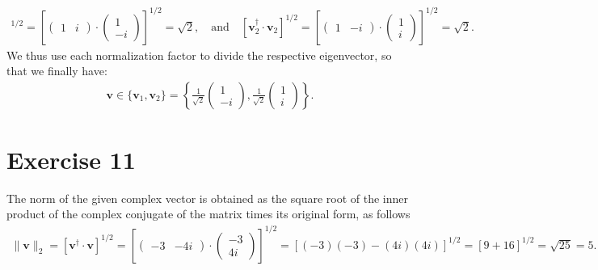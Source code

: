 \documentclass[letterpaper,11pt,twoside]{article}
\begin{document}
\begin{align*}
  [\bm{v}_1^\dagger\cdot\bm{v}_1]^{1/2}=\left[\begin{pmatrix}
    1&i
  \end{pmatrix}\cdot\begin{pmatrix}
    1\\-i
  \end{pmatrix}\right]^{1/2}=\sqrt{2},\quad\text{and}\quad
  [\bm{v}_2^\dagger\cdot\bm{v}_2]^{1/2}=\left[\begin{pmatrix}
    1&-i
  \end{pmatrix}\cdot\begin{pmatrix}
    1\\i
  \end{pmatrix}\right]^{1/2}=\sqrt{2}.
\end{align*}
We thus use each normalization factor to divide the respective eigenvector, so that we finally have:
\begin{align*}
  \bm{v}\in\{\bm{v}_1,\bm{v}_2\}=\left\{\frac{1}{\sqrt{2}}\begin{pmatrix}
  1\\-i\end{pmatrix},\frac{1}{\sqrt{2}}\begin{pmatrix}
  1\\i\end{pmatrix}\right\}.
\end{align*}
\section{Exercise 11} 
The norm of the given complex vector is obtained as the square root of the inner product of the complex conjugate of the matrix times its
original form, as follows
\begin{align*}
  \|\bm{v}\|_2=[\bm{v}^\dagger\cdot\bm{v}]^{1/2}=\left[
    \begin{pmatrix}
      -3&-4i
    \end{pmatrix}\cdot\begin{pmatrix}
      -3\\4i
    \end{pmatrix}
  \right]^{1/2}=[(-3)(-3)-(4i)(4i)]^{1/2}=[9+16]^{1/2}=\sqrt{25}=5.
\end{align*}
\end{document}
